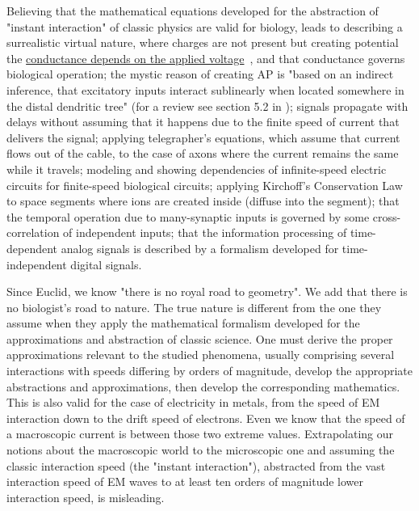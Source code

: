 Believing that the mathematical equations developed for the abstraction
of "instant interaction" of classic physics are valid for biology,
leads to describing a surrealistic virtual nature, where charges are
not present but creating potential
the  \href{https://doi.org/10.1038/9173}{conductance depends
on the applied voltage}~\cite{KochVoltageDependentConductance:1999},
and that conductance governs biological operation; the mystic reason
of creating 
AP is "based on an indirect inference, that excitatory
inputs interact sublinearly when located somewhere in the distal dendritic
tree" (for a review see section 5.2 in \cite{KochBiophysics:1999});
signals propagate with delays without assuming that it happens due
to the finite speed of current that delivers the signal; applying
telegrapher's equations, which assume that current flows out of the
cable, to the case of axons where the current remains the same while
it travels; modeling and showing dependencies of infinite-speed electric
circuits for finite-speed biological circuits; applying Kirchoff's
Conservation Law to space segments where ions are created inside (diffuse
into the segment); that the temporal operation due to many-synaptic
inputs is governed by some cross-correlation of independent inputs; that the information
processing of time-dependent analog signals is described by a formalism
developed for time-independent digital signals.

Since Euclid, we know "there is no royal road to geometry". We
add that there is no biologist's road to nature. The true nature is
different from the one they assume when they apply the mathematical formalism
developed for the approximations and abstraction of classic science.
One must derive the proper approximations relevant
to the studied phenomena, usually comprising several interactions
with speeds differing by orders of magnitude, develop the appropriate
abstractions and approximations, then develop the corresponding mathematics.
This is also valid for the
case of electricity in metals, from  the speed of 
EM
interaction down to the drift speed of electrons. Even we know that
the speed of a macroscopic current
is between those two extreme values.
Extrapolating our notions about the macroscopic world to the microscopic
one and assuming the classic interaction speed (the "instant
interaction"), abstracted from the vast interaction
speed of 
EM 
waves to at least ten orders of magnitude lower
interaction speed, is misleading.



